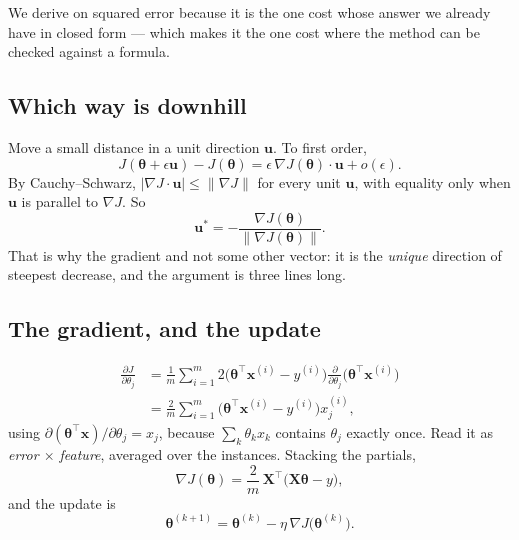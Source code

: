 \documentclass[11pt,a4paper]{article}
\begin{document}
We derive on squared error because it is the one cost whose answer we already
have in closed form --- which makes it the one cost where the method can be
checked against a formula.

\subsection{Which way is downhill}

Move a small distance in a unit direction $\mathbf{u}$. To first order,
\[ J(\boldsymbol\theta + \epsilon\mathbf{u}) - J(\boldsymbol\theta)
   = \epsilon\,\nabla J(\boldsymbol\theta)\cdot\mathbf{u} + o(\epsilon). \]
By Cauchy--Schwarz, $\lvert\nabla J\cdot\mathbf{u}\rvert \le \lVert\nabla
J\rVert$ for every unit $\mathbf{u}$, with equality only when $\mathbf{u}$ is
parallel to $\nabla J$. So
\[ \mathbf{u}^{\ast} = -\frac{\nabla J(\boldsymbol\theta)}
                             {\lVert\nabla J(\boldsymbol\theta)\rVert}. \]
That is why the gradient and not some other vector: it is the \emph{unique}
direction of steepest decrease, and the argument is three lines long.

\subsection{The gradient, and the update}

\begin{derivbox}[title={One partial derivative, then stack them}]
\[
\begin{aligned}
\frac{\partial J}{\partial\theta_j}
 &= \frac{1}{m}\sum_{i=1}^{m}
    2\bigl(\boldsymbol\theta^{\intercal}\mathbf{x}^{(i)} - y^{(i)}\bigr)
    \frac{\partial}{\partial\theta_j}
    \bigl(\boldsymbol\theta^{\intercal}\mathbf{x}^{(i)}\bigr) \\[2pt]
 &= \frac{2}{m}\sum_{i=1}^{m}
    \bigl(\boldsymbol\theta^{\intercal}\mathbf{x}^{(i)} - y^{(i)}\bigr)
    x_j^{(i)},
\end{aligned}
\]
using $\partial(\boldsymbol\theta^{\intercal}\mathbf{x})/\partial\theta_j =
x_j$, because $\sum_k \theta_k x_k$ contains $\theta_j$ exactly once. Read it
as \emph{error $\times$ feature}, averaged over the instances. Stacking the
partials,
\[ \nabla J(\boldsymbol\theta) = \frac{2}{m}\,\mathbf{X}^{\intercal}
   \bigl(\mathbf{X}\boldsymbol\theta - y\bigr), \]
and the update is
\[ \boldsymbol\theta^{(k+1)} = \boldsymbol\theta^{(k)}
   - \eta\,\nabla J\bigl(\boldsymbol\theta^{(k)}\bigr). \]
\end{derivbox}
\end{document}
